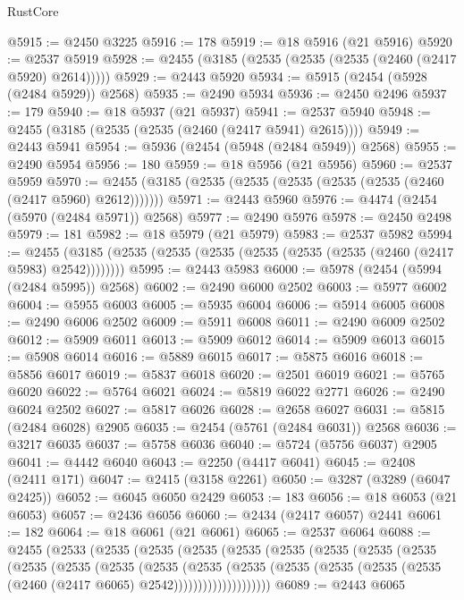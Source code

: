 \begin{lexlean}{RustCore}
\begin{coremodule}
@5915 := @2450 @3225
@5916 := 178
@5919 := @18 @5916 (@21 @5916)
@5920 := @2537 @5919
@5928 := @2455 (@3185 (@2535 (@2535 (@2535 (@2460 (@2417 @5920) @2614)))))
@5929 := @2443 @5920
@5934 := @5915 (@2454 (@5928 (@2484 @5929)) @2568)
@5935 := @2490 @5934
@5936 := @2450 @2496
@5937 := 179
@5940 := @18 @5937 (@21 @5937)
@5941 := @2537 @5940
@5948 := @2455 (@3185 (@2535 (@2535 (@2460 (@2417 @5941) @2615))))
@5949 := @2443 @5941
@5954 := @5936 (@2454 (@5948 (@2484 @5949)) @2568)
@5955 := @2490 @5954
@5956 := 180
@5959 := @18 @5956 (@21 @5956)
@5960 := @2537 @5959
@5970 := @2455 (@3185 (@2535 (@2535 (@2535 (@2535 (@2535 (@2460 (@2417 @5960) @2612)))))))
@5971 := @2443 @5960
@5976 := @4474 (@2454 (@5970 (@2484 @5971)) @2568)
@5977 := @2490 @5976
@5978 := @2450 @2498
@5979 := 181
@5982 := @18 @5979 (@21 @5979)
@5983 := @2537 @5982
@5994 := @2455 (@3185 (@2535 (@2535 (@2535 (@2535 (@2535 (@2535 (@2460 (@2417 @5983) @2542))))))))
@5995 := @2443 @5983
@6000 := @5978 (@2454 (@5994 (@2484 @5995)) @2568)
@6002 := @2490 @6000 @2502
@6003 := @5977 @6002
@6004 := @5955 @6003
@6005 := @5935 @6004
@6006 := @5914 @6005
@6008 := @2490 @6006 @2502
@6009 := @5911 @6008
@6011 := @2490 @6009 @2502
@6012 := @5909 @6011
@6013 := @5909 @6012
@6014 := @5909 @6013
@6015 := @5908 @6014
@6016 := @5889 @6015
@6017 := @5875 @6016
@6018 := @5856 @6017
@6019 := @5837 @6018
@6020 := @2501 @6019
@6021 := @5765 @6020
@6022 := @5764 @6021
@6024 := @5819 @6022 @2771
@6026 := @2490 @6024 @2502
@6027 := @5817 @6026
@6028 := @2658 @6027
@6031 := @5815 (@2484 @6028) @2905
@6035 := @2454 (@5761 (@2484 @6031)) @2568
@6036 := @3217 @6035
@6037 := @5758 @6036
@6040 := @5724 (@5756 @6037) @2905
@6041 := @4442 @6040
@6043 := @2250 (@4417 @6041)
@6045 := @2408 (@2411 @171)
@6047 := @2415 (@3158 @2261)
@6050 := @3287 (@3289 (@6047 @2425))
@6052 := @6045 @6050 @2429
@6053 := 183
@6056 := @18 @6053 (@21 @6053)
@6057 := @2436 @6056
@6060 := @2434 (@2417 @6057) @2441
@6061 := 182
@6064 := @18 @6061 (@21 @6061)
@6065 := @2537 @6064
@6088 := @2455
    (@2533
      (@2535
        (@2535
          (@2535
            (@2535
              (@2535
                (@2535
                  (@2535
                    (@2535
                      (@2535
                        (@2535
                          (@2535
                            (@2535
                              (@2535
                                (@2535
                                  (@2535
                                    (@2535
                                      (@2535 (@2535 (@2460 (@2417 @6065) @2542))))))))))))))))))))
@6089 := @2443 @6065

\end{coremodule}
\end{lexlean}
